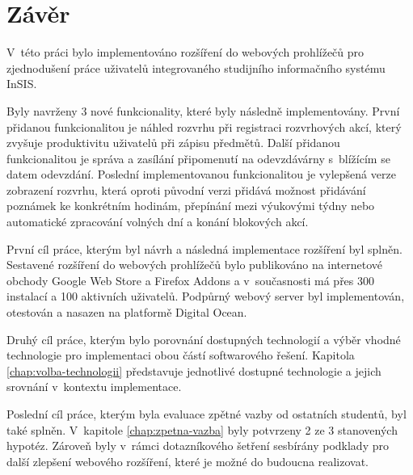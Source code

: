 \chapter*{Závěr}

V~této práci bylo implementováno rozšíření do webových prohlížečů pro zjednodušení práce uživatelů integrovaného studijního informačního systému InSIS.

Byly navrženy 3 nové funkcionality, které byly následně implementovány. První přidanou funkcionalitou je náhled rozvrhu při registraci rozvrhových akcí, který zvyšuje produktivitu uživatelů při zápisu předmětů. Další přidanou funkcionalitou je správa a zasílání připomenutí na odevzdávárny s~blížícím se datem odevzdání. Poslední implementovanou funkcionalitou je vylepšená verze zobrazení rozvrhu, která oproti původní verzi přidává možnost přidávání poznámek ke konkrétním hodinám, přepínání mezi výukovými týdny nebo automatické zpracování volných dní a konání blokových akcí.

První cíl práce, kterým byl návrh a následná implementace rozšíření byl splněn. Sestavené rozšíření do webových prohlížečů bylo publikováno na internetové obchody Google Web Store a Firefox Addons a v~současnosti má přes 300 instalací a 100 aktivních uživatelů. Podpůrný webový server byl implementován, otestován a nasazen na platformě Digital Ocean.

Druhý cíl práce, kterým bylo porovnání dostupných technologií a výběr vhodné technologie pro implementaci obou částí softwarového řešení. Kapitola \ref{chap:volba-technologii} představuje jednotlivé dostupné technologie a jejich srovnání v~kontextu implementace. 

Poslední cíl práce, kterým byla evaluace zpětné vazby od ostatních studentů, byl také splněn. V~kapitole 
\ref{chap:zpetna-vazba} byly potvrzeny 2 ze 3 stanovených hypotéz. Zároveň byly v~rámci dotazníkového šetření sesbírány podklady pro další zlepšení webového rozšíření, které je možné do budoucna realizovat.